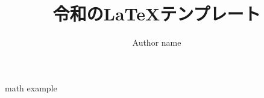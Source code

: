 \documentclass[a4paper,11pt]{ltjreport}
\title{令和の\LaTeX テンプレート}
\author{Author name}
\date{\the\year}
\begin{document}
\maketitle

{math}
{example}
\end{document}
